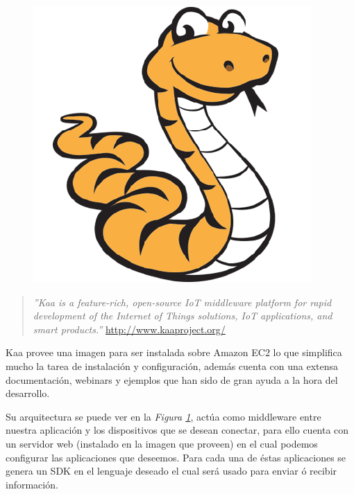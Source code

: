 \begin{figure}[ht]
  \begin{center}
    \includegraphics[scale=0.10]{../images/kaa/logo.png}
    \label{fig:kaalog}
	\end{center}
\end{figure}

\begin{quote}\textit{''Kaa is a feature-rich, open-source IoT middleware platform for rapid development of the Internet of Things solutions, IoT applications, and smart products.''}
\newline
\url{http://www.kaaproject.org/}
\end{quote}

Kaa provee una imagen para ser instalada sobre Amazon EC2 lo que simplifica mucho la tarea de instalación y configuración, además cuenta con una extensa documentación, webinars y ejemplos que han sido de gran ayuda a la hora del desarrollo.

Su arquitectura se puede ver en la \textit{Figura \ref{fig:kaalog}}, actúa como middleware entre nuestra aplicación y los dispositivos que se desean conectar, para ello cuenta con un servidor web (instalado en la imagen que proveen) en el cual podemos configurar las aplicaciones que deseemos. Para cada una de éstas aplicaciones se genera un SDK en el lenguaje deseado el cual será usado para enviar ó recibir información.


